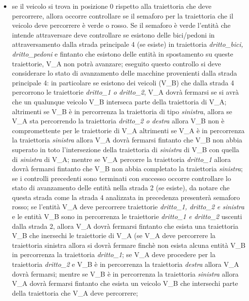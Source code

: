 \begin{enumerate}
\begin{enumerate}
\begin{itemize}
\item se il veicolo si trova in posizione 0 rispetto alla traiettoria che deve percorrere, allora occorre controllare se il semaforo per la traiettoria che il veicolo deve percorrere è verde o rosso. Se il semaforo è verde l'entità che intende attraversare deve controllare se esistono delle bici/pedoni in attraversamento dalla strada principale 4 (se esiste) in traiettoria \textit{drit\-to\_bi\-ci, drit\-to\_pe\-do\-ni} e fintanto che esistono delle entità in spostamento su queste traiettorie, V\_A non potrà avanzare; eseguito questo controllo si deve considerare lo stato di avanzamento delle macchine provenienti dalla strada principale 4: in particolare se esistono dei veicoli (V\_B) che dalla strada 4 percorrono le traiettorie \textit{dritto\_1 o dritto\_2}, V\_A dovrà fermarsi se si avrà che un qualunque veicolo V\_B interseca parte della traiettoria di V\_A; altrimenti se V\_B è in percorrenza la traiettoria di tipo \textit{sinistra}, allora se V\_A sta percorrendo la traiettoria \textit{dritto\_2 o destra} allora V\_B non è compromettente per le traiettorie di V\_A altrimenti se V\_A è in percorrenza la traiettoria \textit{sinistra} allora V\_A dovrà fermarsi fintanto che V\_B non abbia superato in toto l'intersezione della traiettoria di \textit{sinistra} di V\_B con quella di \textit{sinistra} di V\_A; mentre se V\_A percorre la traiettoria \textit{dritto\_1} allora dovrà fermarsi fintanto che V\_B non abbia completato la traiettoria \textit{sinistra}; se i controlli precedenti sono terminati con successo occorre controllare lo stato di avanzamento delle entità nella strada 2 (se esiste), da notare che questa strada come la strada 4 analizzata in precedenza presenterà semaforo rosso; se l'entità V\_A deve percorrere traiettorie \textit{dritto\_1, dritto\_2 e sinistra} e le entità V\_B sono in percorrenza le traiettorie \textit{dritto\_1 e dritto\_2} uscenti dalla strada 2, allora V\_A dovrà fermarsi fintanto che esista una traiettoria V\_B  che inersechi le traiettorie di V\_A (se V\_A deve percorrere la traiettoria sinistra allora si dovrà fermare finchè non esista alcuna entità V\_B in percorrenza la traiettoria \textit{dritto\_1}; se V\_A deve procedere per la traiettoria \textit{dritto\_2} e V\_B è in percorrenza la traiettoria \textit{destra} allora V\_A dovrà fermarsi; mentre se V\_B è in percorrenza la traiettoria \textit{sinistra} allora V\_A dovrà fermarsi fintanto che esista un veicolo V\_B che intersechi parte della traiettoria che V\_A deve percorrere;

\end{itemize}
\end{enumerate}
\end{enumerate}
